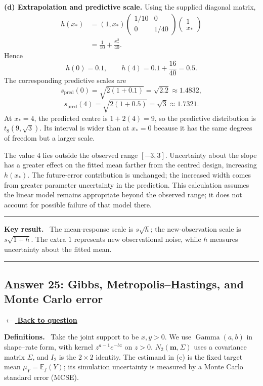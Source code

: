 \documentclass[11pt,a4paper]{article}
\newcommand{\E}{\mathbb{E}}
\newcommand{\answernav}[1]{%
  \label{answer:#1}%
  \noindent\hyperref[question:#1]{$\leftarrow$ \textbf{Back to question}}%
  \par\smallskip}
\newcommand{\studyheading}[1]{%
  \par\medskip\noindent\textcolor{statblue}{\textbf{#1.}}\ }
\newenvironment{keyresult}
  {\begin{center}\begin{minipage}{0.92\linewidth}\color{statblue}%
   \hrule\vspace{6pt}\textbf{Key result.}\ }
  {\vspace{6pt}\hrule\end{minipage}\end{center}}
\begin{document}
\textbf{(d) Extrapolation and predictive scale.}
Using the supplied diagonal matrix,
\[
\begin{aligned}
h(x_*)&=(1,x_*)
\begin{pmatrix}1/10&0\\0&1/40\end{pmatrix}
\begin{pmatrix}1\\x_*\end{pmatrix}\\
&=\frac1{10}+\frac{x_*^2}{40}.
\end{aligned}
\]
Hence
\[
\boxed{h(0)=0.1,\qquad h(4)=0.1+\frac{16}{40}=0.5.}
\]
The corresponding predictive scales are
\[
\boxed{s_{\mathrm{pred}}(0)=\sqrt{2(1+0.1)}=\sqrt{2.2}\approx1.4832,}
\]
\[
\boxed{s_{\mathrm{pred}}(4)=\sqrt{2(1+0.5)}=\sqrt3\approx1.7321.}
\]
At $x_*=4$, the predicted centre is $1+2(4)=9$, so the predictive
distribution is $t_8(9,\sqrt3)$. Its interval is wider than at $x_*=0$
because it has the same degrees of freedom but a larger scale.

The value $4$ lies outside the observed range $[-3,3]$. Uncertainty about
the slope has a greater effect on the fitted mean farther from the centred
design, increasing $h(x_*)$. The future-error contribution is unchanged;
the increased width comes from greater parameter uncertainty in the prediction.
This calculation assumes the linear model remains appropriate beyond the
observed range; it does not account for possible failure of that model there.

\begin{keyresult}
The mean-response scale is $s\sqrt h$; the new-observation scale is
$s\sqrt{1+h}$. The extra $1$ represents new observational noise, while
$h$ measures uncertainty about the fitted mean.
\end{keyresult}

\clearpage

\subsection{Answer 25: Gibbs, Metropolis--Hastings, and Monte Carlo error}
\answernav{25}

\studyheading{Definitions}
Take the joint support to be $x,y>0$.
We use $\operatorname{Gamma}(a,b)$ in shape--rate form, with kernel
$z^{a-1}e^{-bz}$ on $z>0$.
$N_2(\mathbf m,\Sigma)$ uses a covariance matrix $\Sigma$, and $I_2$ is the $2\times2$ identity.
The estimand in (c) is the fixed target mean $\mu_Y=\E_f(Y)$; its simulation uncertainty is measured by a Monte Carlo standard error (MCSE).
\end{document}

